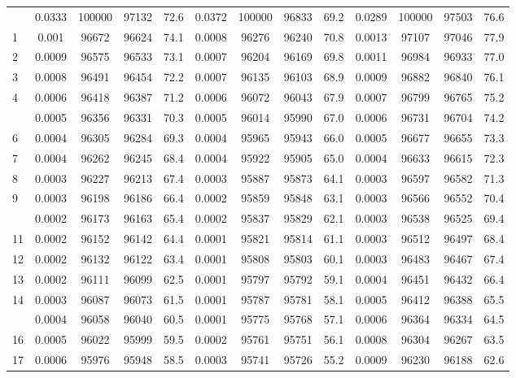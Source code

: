 \documentclass[
  14pt,
]{article}
\begin{document}
\begin{longtable}[t]{lcccccccccccc}
\endfoot
\bottomrule
\endlastfoot
0 & 0.0333 & 100000 & 97132 & 72.6 & 0.0372 & 100000 & 96833 & 69.2 & 0.0289 & 100000 & 97503 & 76.6\\
1 & 0.001 & 96672 & 96624 & 74.1 & 0.0008 & 96276 & 96240 & 70.8 & 0.0013 & 97107 & 97046 & 77.9\\
2 & 0.0009 & 96575 & 96533 & 73.1 & 0.0007 & 96204 & 96169 & 69.8 & 0.0011 & 96984 & 96933 & 77.0\\
3 & 0.0008 & 96491 & 96454 & 72.2 & 0.0007 & 96135 & 96103 & 68.9 & 0.0009 & 96882 & 96840 & 76.1\\
4 & 0.0006 & 96418 & 96387 & 71.2 & 0.0006 & 96072 & 96043 & 67.9 & 0.0007 & 96799 & 96765 & 75.2\\
\addlinespace
5 & 0.0005 & 96356 & 96331 & 70.3 & 0.0005 & 96014 & 95990 & 67.0 & 0.0006 & 96731 & 96704 & 74.2\\
6 & 0.0004 & 96305 & 96284 & 69.3 & 0.0004 & 95965 & 95943 & 66.0 & 0.0005 & 96677 & 96655 & 73.3\\
7 & 0.0004 & 96262 & 96245 & 68.4 & 0.0004 & 95922 & 95905 & 65.0 & 0.0004 & 96633 & 96615 & 72.3\\
8 & 0.0003 & 96227 & 96213 & 67.4 & 0.0003 & 95887 & 95873 & 64.1 & 0.0003 & 96597 & 96582 & 71.3\\
9 & 0.0003 & 96198 & 96186 & 66.4 & 0.0002 & 95859 & 95848 & 63.1 & 0.0003 & 96566 & 96552 & 70.4\\
\addlinespace
10 & 0.0002 & 96173 & 96163 & 65.4 & 0.0002 & 95837 & 95829 & 62.1 & 0.0003 & 96538 & 96525 & 69.4\\
11 & 0.0002 & 96152 & 96142 & 64.4 & 0.0001 & 95821 & 95814 & 61.1 & 0.0003 & 96512 & 96497 & 68.4\\
12 & 0.0002 & 96132 & 96122 & 63.4 & 0.0001 & 95808 & 95803 & 60.1 & 0.0003 & 96483 & 96467 & 67.4\\
13 & 0.0002 & 96111 & 96099 & 62.5 & 0.0001 & 95797 & 95792 & 59.1 & 0.0004 & 96451 & 96432 & 66.4\\
14 & 0.0003 & 96087 & 96073 & 61.5 & 0.0001 & 95787 & 95781 & 58.1 & 0.0005 & 96412 & 96388 & 65.5\\
\addlinespace
15 & 0.0004 & 96058 & 96040 & 60.5 & 0.0001 & 95775 & 95768 & 57.1 & 0.0006 & 96364 & 96334 & 64.5\\
16 & 0.0005 & 96022 & 95999 & 59.5 & 0.0002 & 95761 & 95751 & 56.1 & 0.0008 & 96304 & 96267 & 63.5\\
17 & 0.0006 & 95976 & 95948 & 58.5 & 0.0003 & 95741 & 95726 & 55.2 & 0.0009 & 96230 & 96188 & 62.6\\

\end{longtable}
\end{document}
